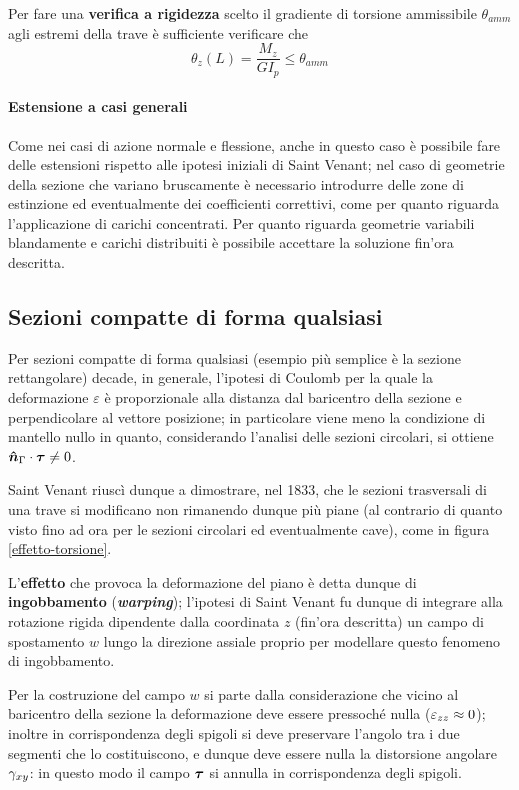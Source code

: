     	Per fare una \textbf{verifica a rigidezza} scelto il gradiente di torsione ammissibile $\theta_{amm}$ agli estremi della trave è sufficiente verificare che
    	\[ \theta_z(L) = \frac{M_z}{GI_p} \leq \theta_{amm} \]
    	
    	\paragraph{Estensione a casi generali} Come nei casi di azione normale e flessione, anche in questo caso è possibile fare delle estensioni rispetto alle ipotesi iniziali di Saint Venant; nel caso di geometrie della sezione che variano bruscamente è necessario introdurre delle zone di estinzione ed eventualmente dei coefficienti correttivi, come per quanto riguarda l'applicazione di carichi concentrati. Per quanto riguarda geometrie variabili blandamente e carichi distribuiti è possibile accettare la soluzione fin'ora descritta.
    	
    \subsection{Sezioni compatte di forma qualsiasi}
    	Per sezioni compatte di forma qualsiasi (esempio più semplice è la sezione rettangolare) decade, in generale, l'ipotesi di Coulomb per la quale la deformazione $\varepsilon$ è proporzionale alla distanza dal baricentro della sezione e perpendicolare al vettore posizione; in particolare viene meno la condizione di mantello nullo in quanto, considerando l'analisi delle sezioni circolari, si ottiene $\boldsymbol{\hat{n}}_\Gamma  \cdot \boldsymbol{\tau} \neq 0$.
    	
    	Saint Venant riuscì dunque a dimostrare, nel 1833, che le sezioni trasversali di una trave si modificano non rimanendo dunque più piane (al contrario di quanto visto fino ad ora per le sezioni circolari ed eventualmente cave), come in figura \ref{effetto-torsione}.
    	
    	
    	\begin{concetto}
    		L'\textbf{effetto} che provoca la deformazione del piano è detta dunque di \textbf{ingobbamento} (\textit{\textbf{warping}}); l'ipotesi di Saint Venant fu dunque di integrare alla rotazione rigida dipendente dalla coordinata $z$ (fin'ora descritta) un campo di spostamento $w$ lungo la direzione assiale proprio per modellare questo fenomeno di ingobbamento.
    	\end{concetto}
    	Per la costruzione del campo $w$ si parte dalla considerazione che vicino al baricentro della sezione la deformazione deve essere pressoché nulla ($\varepsilon_{zz} \approx 0$); inoltre in corrispondenza degli spigoli si deve preservare l'angolo tra i due segmenti che lo costituiscono, e dunque deve essere nulla la distorsione angolare $\gamma_{xy}$: in questo modo il campo $\boldsymbol{\tau}$ si annulla in corrispondenza degli spigoli.
    	
